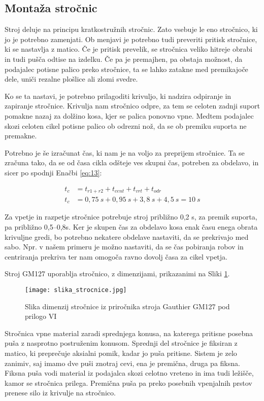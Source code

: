 \subsection{Montaža stročnic}
Stroj deluje na principu kratkostružnih stročnic. Zato vsebuje le eno stročnico,
ki jo je potrebno zamenjati. Ob menjavi je potrebno tudi preveriti pritisk
stročnice, ki se nastavlja z matico. Če je pritisk prevelik, se stročnica veliko
hitreje obrabi in tudi pušča odtise na izdelku. Če pa je premajhen, pa obstaja možnost,
da podajalec potisne palico preko stročnice, ta se lahko zatakne med
premikajoče dele, uniči rezalne plošlice ali zlomi svedre.

Ko se ta nastavi, je potrebno prilagoditi krivuljo, ki nadzira odpiranje in
zapiranje stročnice. Krivulja nam stročnico odpre, za tem se celoten zadnji suport
pomakne nazaj za dolžino kosa, kjer se palica ponovno vpne. Medtem podajalec
skozi celoten cikel potisne palico ob odrezni nož, da se ob premiku suporta ne premakne.

Potrebno je še izračunat čas, ki nam je na voljo za preprijem stročnice.
Ta se zračuna tako, da se od časa cikla odšteje ves skupni čas, potreben
za obdelavo, in sicer po spodnji Enačbi \ref{eq:13}:

\begin{equation}
	\label{eq:13}
	\begin{split}
		t_c &= t_{r1+r2} + t_{cent} + t_{vrt} + t_{odr} \\
		t_c &= 0,75\ s + 0,95\ s + 3,8\ s + 4,5\ s = 10\ s
	\end{split}
\end{equation}

Za vpetje in razpetje stročnice potrebuje stroj približno 0,2 s, za premik
suporta, pa približno 0,5--0,8s. Ker je skupen čas za obdelavo kosa
enak času enega obrata krivuljne gredi, bo potrebno nekatere obdelave
nastaviti, da se prekrivajo med sabo. Npr. v našem primeru je možno
nastaviti, da se čas pobiranja robov in centriranja prekriva ter
nam omogoča ravno dovolj časa za cikel vpetja.

Stroj GM127 uporablja stročnico,
z dimenzijami, prikazanimi na Sliki \ref{slika_strocnice}.

\begin{figure}[H]
	\begin{center}
		\texttt{[image: slika\_strocnice.jpg]}
		\caption{Slika dimenzij stročnice iz priročnika
			stroja Gauthier GM127 pod prilogo VI
			\cite{gauthier}}
		\label{slika_strocnice}
	\end{center}
\end{figure}

Stročnica vpne material zaradi sprednjega konusa, na katerega
pritisne posebna puša z nasprotno postruženim konusom. Sprednji
del stročnice je fiksiran z matico, ki preprečuje aksialni pomik,
kadar jo puša pritisne. Sistem je zelo zanimiv, saj imamo dve
puši znotraj cevi, ena je premična, druga pa fiksna. Fiksna puša
vodi material iz podajalca skozi celotno vreteno in ima tudi
ležišče, kamor se stročnica prilega. Premična puša pa preko
posebnih vpenjalnih prstov prenese silo iz krivulje na stročnico.